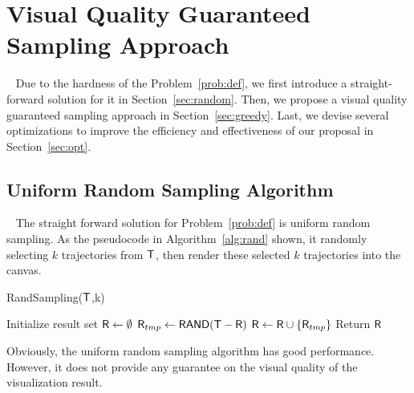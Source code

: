 \section{Visual Quality Guaranteed Sampling Approach}~\label{sec:sol}
Due to the hardness of the Problem~\ref{prob:def}, we first introduce a straight-forward solution for it in Section~\ref{sec:random}.
Then, we propose a visual quality guaranteed sampling approach in Section~\ref{sec:greedy}.
Last, we devise several optimizations to improve the efficiency and effectiveness of our proposal in Section~\ref{sec:opt}.


\subsection{Uniform Random Sampling Algorithm}~\label{sec:random}
The straight forward solution for Problem~\ref{prob:def} is uniform random sampling.
As the pseudocode in Algorithm~\ref{alg:rand} shown, it randomly selecting $k$ trajectories from $\mathsf{T}$, then render these selected $k$ trajectories into the canvas.

\begin{algorithm}
    \caption{RandSampling($\mathsf{T}$,k)} \label{alg:rand}
    \begin{algorithmic}[1]
    \State Initialize result set $\mathsf{R} \leftarrow \emptyset$
        \State $\mathsf{R}_{tmp} \leftarrow \mathsf{RAND(\mathsf{T}-\mathsf{R})}$
        \State $\mathsf{R} \leftarrow \mathsf{R} \cup \{ \mathsf{R}_{tmp} \}$
    \EndWhile
    \State Return $\mathsf{R}$
    \end{algorithmic}
\end{algorithm}

Obviously, the uniform random sampling algorithm has good performance.
However, it does not provide any guarantee on the visual quality of the visualization result.




